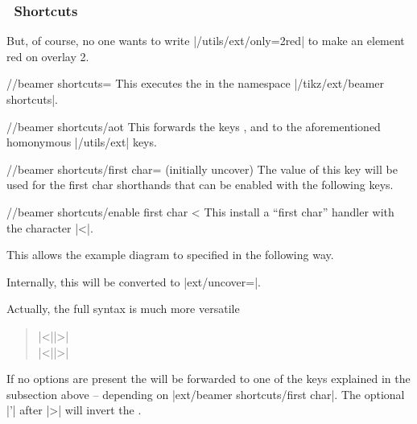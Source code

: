 \subsubsection{\Beamer\ Shortcuts}
But, of course, no one wants to write |/utils/ext/only={2}{red}| to
make an element red on overlay 2.
\begin{key}{/\tikzext/beamer shortcuts=}
  This executes the  in the namespace |/tikz/ext/beamer shortcuts|.
\end{key}
\begin{key}{/\tikzext/beamer shortcuts/aot}
  This forwards the keys , 
  and  to the aforementioned homonymous |/utils/ext| keys.
\end{key}
\begin{key}{/\tikzext/beamer shortcuts/first char=%
   (initially uncover)}
  The value of this key will be used for the first char shorthands that can be enabled with the following keys.
\begin{key}{/\tikzext/beamer shortcuts/enable first char <}
  This install a \enquote{first char} handler with the character |<|.
  
  This allows the example diagram to specified in the following way.
\begin{codeexample}[preamble=\usetikzlibrary{ext.beamer} \setbeamercovered{transparent},code only]
\end{codeexample}

  Internally, this will be converted to |ext/uncover=|.
  
  Actually, the full syntax is much more versatile
  \begin{quote}
      |<||>|\\
      |<||>|
  \end{quote}
  
  If no options are present the  will
  be forwarded to one of the keys explained in the subsection above
  -- depending on |ext/beamer shortcuts/first char|.
  The optional |'| after |>| will invert the .
  

\end{key}
\end{key}

